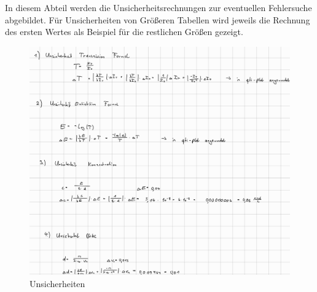 \documentclass[12pt,a4paper,twoside]{article}
\begin{document}
In diesem Abteil werden die Unsicherheitsrechnungen zur eventuellen Fehlersuche abgebildet. Für Unsicherheiten von Größeren Tabellen wird jeweils die Rechnung des ersten Wertes als Beispiel für die restlichen Größen gezeigt.

\begin{figure}[H]
    \centering
    \includegraphics[width=0.9\linewidth]{nudes/Unsicherheiten1.jpg}
    \caption{Unsicherheiten}
    \label{fig:Unsicherheiten1}
\end{figure}

\printbibliography[heading=bibintoc]
\end{document}

